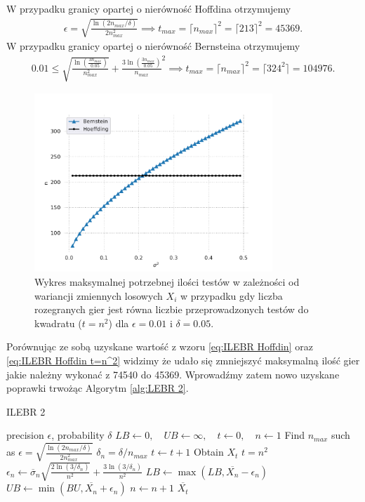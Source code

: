 \documentclass[inzynierska]{pwr_wmat_praca_dyplomowa}
\theoremstyle{plain}
\numberwithin{theorem}{chapter}
\theoremstyle{definition}
\numberwithin{theorem}{chapter}
\begin{document}
	W przypadku granicy opartej o nierówność Hoffdina otrzymujemy
	\begin{gather}
		\label{eq:ILEBR Hoffdin t=n^2}
		\epsilon =  \sqrt{\frac{\ln(2n_{max}/\delta)}{2n_{max}^2}} \implies t_{max} = \lceil n_{max} \rceil^2 = \lceil213\rceil^2= 45369.
	\end{gather}
	W przypadku granicy opartej o nierówność Bernsteina otrzymujemy
	\begin{gather}
		\label{eq:ILEBR Bernstein t=n^2}
		0.01 \le \sqrt{\frac{\ln(\frac{3n_{max}}{0.05})}{n_{max}^2}} + \frac{3  \ln(\frac{3n_{max}}{0.05})}{n_{max}}^2\implies t_{max} = \lceil n_{max} \rceil^2 = \lceil324^2\rceil= 104976. 
	\end{gather}
	\begin{figure}
		\centering
		\includegraphics[width=0.8\textwidth]{imagens/t_eq_n_q.pdf}
		\caption{Wykres maksymalnej potrzebnej ilości testów w zależności od wariancji zmiennych losowych  $X_i$ w przypadku gdy liczba rozegranych gier jest równa liczbie przeprowadzonych testów do kwadratu ($t = n^2$) dla $\epsilon=0.01$ i $\delta = 0.05$.}
		\label{fig:t_eq_n_q}
	\end{figure}
	Porównując ze sobą uzyskane wartość z wzoru \ref{eq:ILEBR Hoffdin} oraz \ref{eq:ILEBR Hoffdin t=n^2} widzimy że udało się zmniejszyć maksymalną ilość gier jakie należny wykonać z 74540 do 45369.
	Wprowadźmy zatem nowo uzyskane poprawki trwożąc Algorytm \ref{alg:LEBR 2}.
	\begin{algorithm}[H]
		\caption{ILEBR 2}\label{alg:LEBR 2}
		\begin{algorithmic}
			\Ensure precision $\epsilon$, probability $\delta$
			\State $LB \gets 0, \quad UB \gets \infty, \quad t \gets 0,\quad n \gets 1$
			\State Find $n_{max}$ such as $		\epsilon =  \sqrt{\frac{\ln(2n_{max}/\delta)}{2n_{max}^2}} $
			\Statex $\delta_n = \delta/n_{max}$
			\Repeat 
			\State $t \gets t + 1$
			\State Obtain $X_t$
			\Until $t=n^2$
			\State $\epsilon_n \gets \overline{\sigma}_n \sqrt{\frac{2\ln(3/\delta_n)}{n^2}} + \frac{3  \ln{(3 / \delta_n)}}{n^2}$ 
			\State $LB \gets \max(LB,  \overline{X_n} - \epsilon_n)$
			\State $UB \gets \min(BU,  \overline{X_n} + \epsilon_n)$
			\State $n \gets n + 1$
			\EndWhile
			\State \Return $ \overline{X_t}$		
		\end{algorithmic}
	\end{algorithm}
\end{document}
